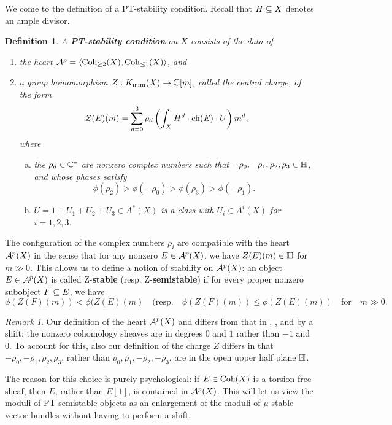 \documentclass[letterpaper,12pt]{amsart}
\newtheorem{defn}[thm]{Definition}
\theoremstyle{remark}
\newtheorem{rmk}[thm]{Remark}
\begin{document}
We come to the definition of a PT-stability condition. Recall that $H \subseteq X$ denotes an ample divisor.
\begin{defn}
    A \textbf{PT-stability condition} on $X$ consists of the data of
    \begin{enumerate}[(1)]
        \item the heart $\mathcal{A}^p = \langle \mathrm{Coh}_{\ge 2}(X), \mathrm{Coh}_{\le 1}(X) \rangle$, and
        \item a group homomorphism $Z: K_{\mathrm{num}}(X) \to \mathbb{C}[m]$, called the \emph{central charge}, of the form
        \[ Z(E)(m) = \sum_{d=0}^3 \rho_d \left(\int_X H^d \cdot \operatorname{\mathrm{ch}}(E) \cdot U\right) m^d, \]
        where
        \begin{enumerate}[(a)]
            \item the $\rho_d \in \mathbb{C}^*$ are nonzero complex numbers such that $-\rho_0, -\rho_1, \rho_2, \rho_3 \in \mathbb{H}$, and whose phases satisfy
            \[ \phi(\rho_2) > \phi(-\rho_0) > \phi(\rho_3) > \phi(-\rho_1). \]
            \item $U = 1 + U_1 + U_2 + U_3 \in A^*(X)$ is a class with $U_i \in A^i(X)$ for $i = 1, 2, 3$.
        \end{enumerate}
    \end{enumerate}
\end{defn}
The configuration of the complex numbers $\rho_i$ are compatible with the heart $\mathcal{A}^p(X)$ in the sense that for any nonzero $E \in \mathcal{A}^p(X)$, we have $Z(E)(m) \in \mathbb{H}$ for $m \gg 0$. This allows us to define a notion of stability on $\mathcal{A}^p(X)$: an object $E \in \mathcal{A}^p(X)$ is called Z-\textbf{stable} (resp. Z-\textbf{semistable}) if for every proper nonzero subobject $F \subseteq E$, we have 
\[ \phi(Z(F)(m)) < \phi(Z(E)(m) \quad (\mathrm{resp.} \quad \phi(Z(F)(m)) \le \phi(Z(E)(m)) \quad \mathrm{for} \quad m \gg 0.  \]

\begin{rmk}
    Our definition of the heart $\mathcal{A}^p(X)$ and differs from that in \cite{lo-PT1}, \cite{lo-PT2}, and \cite{bayer-polynomial} by a shift: the nonzero cohomology sheaves are in degrees $0$ and $1$ rather than $-1$ and $0$. To account for this, also our definition of the charge $Z$ differs in that $-\rho_0, -\rho_1, \rho_2, \rho_3$, rather than $\rho_0, \rho_1, -\rho_2, -\rho_3$, are in the open upper half plane $\mathbb{H}$.
    
    The reason for this choice is purely psychological: if $E \in \mathrm{Coh}(X)$ is a torsion-free sheaf, then $E$, rather than $E[1]$, is contained in $\mathcal{A}^p(X)$. This will let us view the moduli of PT-semistable objects as an enlargement of the moduli of $\mu$-stable vector bundles without having to perform a shift.
\end{rmk} 
\end{document}
